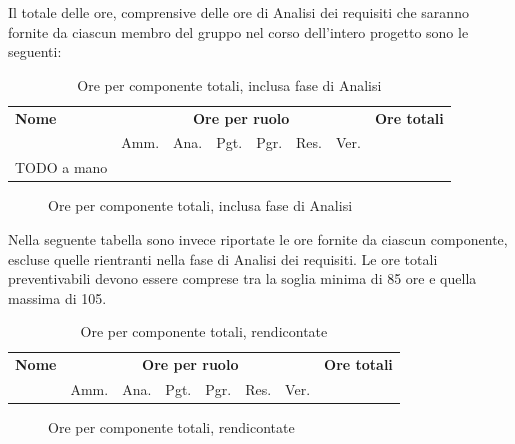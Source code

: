 Il totale delle ore, comprensive delle ore di Analisi dei requisiti che saranno fornite da ciascun membro del gruppo nel corso dell'intero progetto sono le seguenti:

\begin{table}[H]
\centering
\begin{tabular}{lccccccc}
\toprule 
    \textbf{Nome}  & \multicolumn{6}{c}{\textbf{Ore per ruolo}} & \textbf{Ore totali}\\
     & Amm. & Ana. & Pgt. & Pgr. & Res. & Ver. \\
    \midrule

		TODO a mano \\

    \bottomrule
\end{tabular}
\caption{Ore per componente totali, inclusa fase di Analisi}
\end{table}


\begin{figure}[H]
\caption{Ore per componente totali, inclusa fase di Analisi}
\end{figure}

Nella seguente tabella sono invece riportate le ore fornite da ciascun componente, escluse quelle rientranti nella fase di Analisi dei requisiti. 
Le ore totali preventivabili devono essere comprese tra la soglia minima di 85 ore e quella massima di 105.

\begin{table}[H]
\centering
\begin{tabular}{lccccccc}
\toprule 
    \textbf{Nome}  & \multicolumn{6}{c}{\textbf{Ore per ruolo}} & \textbf{Ore totali}\\
     & Amm. & Ana. & Pgt. & Pgr. & Res. & Ver. \\
    \midrule

    	

    \bottomrule
\end{tabular}
\caption{Ore per componente totali, rendicontate}
\end{table}


\begin{figure}[H]
\caption{Ore per componente totali, rendicontate}
\end{figure}

